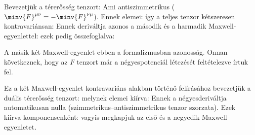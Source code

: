    Bevezetjük a térerősség tenzort:
   Ami antiszimmetrikus ($\minv{F}^{\mu\nu}=-\minv{F}^{\nu\mu}$).
   Ennek elemei:
   így a teljes tenzor kétszeresen kontravariánsan:
   Ennek deriváltja azonos a második és a harmadik Maxwell-egyenlettel:
   ezek pedig összefoglalva:
   
   A másik két Maxwell-egyenlet ebben a formalizmusban azonosság.
   Onnan következnek, hogy az $F$ tenzort már a négyespotenciál létezését feltételezve írtuk fel. 
   
   Ez a két Maxwell-egyenlet kontravariáns alakban történő felírásához bevezetjük a duális térerősség tenzort:
   melynek elemei kiírva:
   Ennek a négyesderiváltja automatikusan nulla (szimmetrikus--antiszimmetrikus tenzor szorzata).
   Ezek kiírva komponensenként:
   vagyis megkapjuk az első és a negyedik Maxwell-egyenletet. 
   

